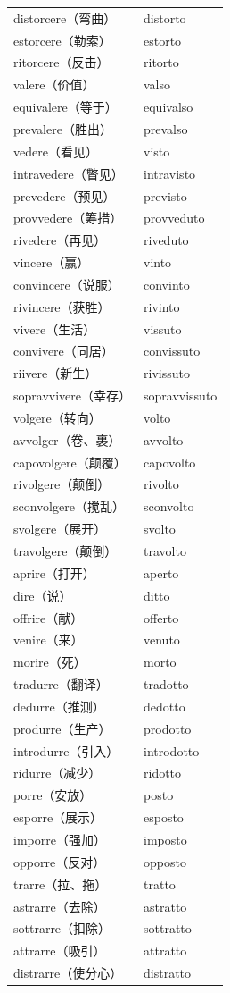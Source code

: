 \documentclass[UTF8,a4paper,titlepage,10pt]{report}
\begin{document}
\begin{enumerate}
\begin{itemize}
\begin{center}
\begin{tabular}{ll}
distorcere（弯曲） & distorto\\
estorcere（勒索） & estorto\\
ritorcere（反击） & ritorto\\
valere（价值） & valso\\
equivalere（等于） & equivalso\\
prevalere（胜出） & prevalso\\
vedere（看见） & visto\\
intravedere（瞥见） & intravisto\\
prevedere（预见） & previsto\\
provvedere（筹措） & provveduto\\
rivedere（再见） & riveduto\\
vincere（赢） & vinto\\
convincere（说服） & convinto\\
rivincere（获胜） & rivinto\\
vivere（生活） & vissuto\\
convivere（同居） & convissuto\\
riivere（新生） & rivissuto\\
sopravvivere（幸存） & sopravvissuto\\
volgere（转向） & volto\\
avvolger（卷、裹） & avvolto\\
capovolgere（颠覆） & capovolto\\
rivolgere（颠倒） & rivolto\\
sconvolgere（搅乱） & sconvolto\\
svolgere（展开） & svolto\\
travolgere（颠倒） & travolto\\
aprire（打开） & aperto\\
dire（说） & ditto\\
offrire（献） & offerto\\
venire（来） & venuto\\
morire（死） & morto\\
tradurre（翻译） & tradotto\\
dedurre（推测） & dedotto\\
produrre（生产） & prodotto\\
introdurre（引入） & introdotto\\
ridurre（减少） & ridotto\\
porre（安放） & posto\\
esporre（展示） & esposto\\
imporre（强加） & imposto\\
opporre（反对） & opposto\\
trarre（拉、拖） & tratto\\
astrarre（去除） & astratto\\
sottrarre（扣除） & sottratto\\
attrarre（吸引） & attratto\\
distrarre（使分心） & distratto\\
\end{tabular}
\end{center}
\end{itemize}


\end{enumerate}
\end{document}
